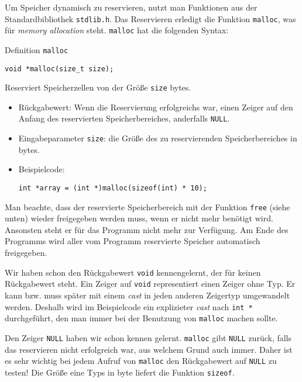 Um Speicher dynamisch zu reservieren, nutzt man Funktionen aus der Standardbibliothek \verb|stdlib.h|.
Das Reservieren erledigt die Funktion \verb|malloc|, was für \emph{memory allocation} steht.
\verb|malloc| hat die folgenden Syntax:
\begin{myexampleblock}{Definition \texttt{malloc}}
\begin{lstlisting}
void *malloc(size_t size);
\end{lstlisting}
  \vspace{-0.7cm}
  Reserviert Speicherzellen von der Größe \verb|size| bytes.
  \begin{itemize}
    \itemsep0.2pt
  \item Rückgabewert: Wenn die Reservierung erfolgreichs war, einen Zeiger auf den Anfang des
    reservierten Speicherbereiches, anderfalls \verb|NULL|.
  \item Eingabeparameter \verb|size|: die Größe des zu reservierenden Speicherbereiches in bytes.
  \item Beispielcode:
\begin{lstlisting}
int *array = (int *)malloc(sizeof(int) * 10);
\end{lstlisting}
  \end{itemize}
  \vspace{-0.7cm}
  Man beachte, dass der reservierte Speicherbereich mit der Funktion \verb|free| (siehe unten) wieder freigegeben werden muss, wenn er nicht mehr benötigt wird. 
  Ansonsten steht er für das Programm nicht mehr zur Verfügung.
  Am Ende des Programms wird aller vom Programm reservierte Speicher automatisch freigegeben.
\end{myexampleblock}
Wir haben schon den Rückgabewert \verb|void| kennengelernt, der für keinen Rückgabewert steht.
Ein Zeiger auf \verb|void| representiert einen Zeiger ohne Typ.
Er kann bzw. muss später mit einem \emph{cast} in jeden anderen Zeigertyp umgewandelt werden.
Deshalb wird im Beispielcode ein explizieter \emph{cast} nach \verb|int *| durchgeführt, den man immer bei der Benutzung von \verb|malloc| machen sollte.

Den Zeiger \verb|NULL| haben wir schon kennen gelernt. 
\verb|malloc| gibt \verb|NULL| zurück, falls das reservieren nicht erfolgreich war, aus welchem Grund auch immer.
Daher ist es sehr wichtig bei jedem Aufruf von \verb|malloc| den Rückgabewert auf \verb|NULL| zu testen!
Die Größe eine Typs in byte liefert die Funktion \verb|sizeof|.

